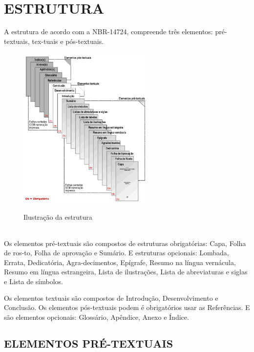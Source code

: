 %
%

\chapter{ESTRUTURA}

A estrutura de acordo com a NBR-14724, compreende três elementos: pré-textuais, tex-tuais e pós-textuais.

\begin{figure}[!htb]
	\vspace*{0,2cm}
    \centering
    \caption{Ilustração da estrutura}
    \includegraphics[width=0.6\textwidth]{./04-figuras/abnt}
    \label{fig:ilustfig2}
\end{figure}
\vspace*{-0,9cm}
{\raggedright {}}\\

Os elementos pré-textuais são compostos de estruturas
obrigatórias: Capa, Folha de ros-to, Folha de aprovação e Sumário. E estruturas opcionais: Lombada, Errata, Dedicatória, Agra-decimentos, Epígrafe, Resumo na língua vernácula, Resumo em língua estrangeira, Lista de ilustrações, Lista de abreviaturas e siglas e Lista de símbolos.

Os elementos textuais são compostos de Introdução,
Desenvolvimento e Conclusão. Os elementos pós-textuais podem é obrigatórios usar as Referências.  E são elementos opcionais: Glossário, Apêndice, Anexo e Índice.

\section{ELEMENTOS PRÉ-TEXTUAIS}

